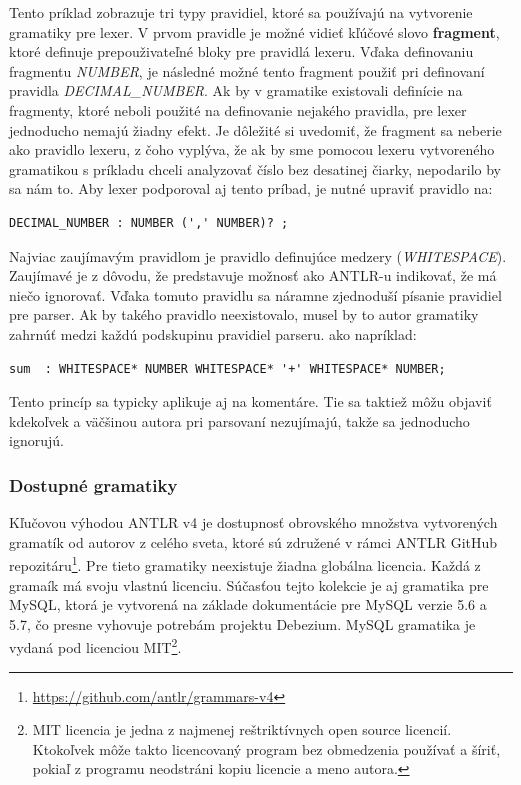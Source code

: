 Tento príklad zobrazuje tri typy pravidiel, ktoré sa používajú na vytvorenie gramatiky pre lexer. V prvom pravidle je možné vidieť kľúčové slovo \textbf{fragment}, ktoré definuje prepouživateľné bloky pre pravidlá lexeru. Vďaka definovaniu fragmentu \textit{NUMBER}, je následné možné tento fragment použiť pri definovaní pravidla \textit{DECIMAL\_NUMBER}. Ak by v gramatike existovali definície na fragmenty, ktoré neboli použité na definovanie nejakého pravidla, pre lexer jednoducho nemajú žiadny efekt. Je dôležité si uvedomiť, že fragment sa neberie ako pravidlo lexeru, z čoho vyplýva, že ak by sme pomocou lexeru vytvoreného gramatikou s príkladu chceli analyzovať číslo bez desatinej čiarky, nepodarilo by sa nám to. Aby lexer podporoval aj tento príbad, je nutné upraviť pravidlo na:

\begin{lstlisting}[basicstyle=\small]
DECIMAL_NUMBER : NUMBER (',' NUMBER)? ;
\end{lstlisting}

Najviac zaujímavým pravidlom je pravidlo definujúce medzery (\textit{WHITESPACE}). Zaujímavé je z dôvodu, že predstavuje možnosť ako ANTLR-u indikovať, že má niečo ignorovať. Vďaka tomuto pravidlu sa náramne zjednoduší písanie pravidiel pre parser. Ak by takého pravidlo neexistovalo, musel by to autor gramatiky zahrnúť medzi každú podskupinu pravidiel parseru. ako napríklad:
\begin{lstlisting}[basicstyle=\small]
sum  : WHITESPACE* NUMBER WHITESPACE* '+' WHITESPACE* NUMBER;
\end{lstlisting}

Tento princíp sa typicky aplikuje aj na komentáre. Tie sa taktiež môžu objaviť kdekoľvek a väčšinou autora pri parsovaní nezujímajú, takže sa jednoducho ignorujú.

\subsubsection{Dostupné gramatiky}
Kľučovou výhodou ANTLR v4 je dostupnosť obrovského množstva vytvorených gramatík od autorov z celého sveta, ktoré sú združené v rámci ANTLR GitHub repozitáru\footnote{\url{https://github.com/antlr/grammars-v4}}. Pre tieto gramatiky neexistuje žiadna globálna licencia. Každá z gramaík má svoju vlastnú licenciu. Súčasťou tejto kolekcie je aj gramatika pre MySQL, ktorá je vytvorená na základe dokumentácie pre MySQL verzie 5.6 a 5.7, čo presne vyhovuje potrebám projektu Debezium. MySQL gramatika je vydaná pod licenciou MIT\footnote{MIT licencia je jedna z najmenej reštriktívnych open source licencií. Ktokoľvek môže takto licencovaný program bez obmedzenia používať a šíriť, pokiaľ z programu neodstráni kopiu licencie a meno autora.}.

